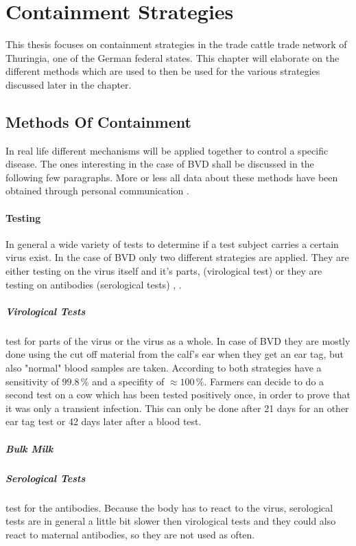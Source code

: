 \section{Containment Strategies}
This thesis focuses on containment strategies in the trade cattle trade network of Thuringia, one of the German federal states. This chapter will elaborate on the different methods which are used to then be used for the various strategies discussed later in the chapter.

\subsection{Methods Of Containment}
In real life different mechanisms will be applied together to control a specific disease. The ones interesting in the case of BVD shall be discussed in the following few paragraphs. More or less all data about these methods have been obtained through personal communication \citep{personalCom}.

\paragraph{Testing}
In general a wide variety of tests to determine if a test subject carries a certain virus exist. In the case of BVD only two different strategies are applied. They are either testing on the virus itself and it's parts, (virological test) or they are testing on antibodies (serological tests) \citep{haller1999diagnostik}, \citep{personalCom}. 

\subparagraph{Virological Tests} test for parts of the virus or the virus as a whole. In case of BVD they are mostly done using the cut off material from the calf's ear when they get an ear tag, but also "normal" blood samples are taken. According to \citep{personalCom} both strategies have a sensitivity of $99.8\,\%$ and a specifity of $\approx 100\,\%$. Farmers can decide to do a second test on a cow which has been tested positively once, in order to prove that it was only a transient infection. This can only be done after 21 days for an other ear tag test or 42 days later after a blood test.

\subparagraph{Bulk Milk}


\subparagraph{Serological Tests} test for the antibodies. Because the body has to react to the virus, serological tests are in general a little bit slower then virological tests and they could also react to maternal antibodies, so they are not used as often.

